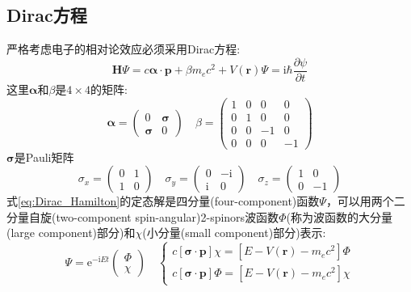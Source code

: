 \documentclass[10pt, oneside, a4paper]{article}      %
\begin{document}
\subsection{\rm{Dirac}方程}
严格考虑电子的相对论效应必须采用\textrm{Dirac}方程:
\begin{equation}
	\mathbf{H}\Psi=c\mathbf{\alpha}\cdot\mathbf{p}+\beta m_ec^2+V(\mathbf{r})\Psi=\mathrm{i}\hbar\dfrac{\partial\psi}{\partial t}
	\label{eq:Dirac_Hamilton}
\end{equation}
这里$\mathbf{\alpha}$和$\beta$是$4\times4$的矩阵:
\begin{equation}
	\mathbf{\alpha}=
	\begin{pmatrix}
		0 &{\bm\sigma}\\
		{\bm\sigma} &0
	\end{pmatrix}\quad
	\beta=
	\begin{pmatrix}
		1 &0 &0 &0\\
		0 &1 &0 &0\\
		0 &0 &-1 &0\\
		0 &0 &0 &-1
	\end{pmatrix}
	\label{eq:alpha_beta}
\end{equation}
$\mathbf{\sigma}$是\textrm{Pauli}矩阵
\begin{equation}
	\sigma_x=
	\begin{pmatrix}
		0 &1\\
		1 &0
	\end{pmatrix}
	\quad \sigma_y=
	\begin{pmatrix}
		0 &-\mathrm{i}\\
		\mathrm{i} &0
	\end{pmatrix}
	\quad \sigma_z=
	\begin{pmatrix}
		1 &0\\
		0 &-1
	\end{pmatrix}
	\label{eq:Pauli_maxtix}
\end{equation}
式\eqref{eq:Dirac_Hamilton}的定态解是四分量(\textrm{four-component})函数$\Psi$，可以用两个二分量自旋(\textrm{two-component spin-angular})2-\textrm{spinors}波函数$\Phi$(称为波函数的大分量(\textrm{large component})部分)和$\chi$(小分量(\textrm{small component})部分)表示:
\begin{equation}
	\Psi = \mathrm{e}^{-\mathrm{i}Et}
	\begin{pmatrix}
		\Phi\\\chi
	\end{pmatrix}
	\quad\left\{
		\begin{aligned}
			c[{\bm\sigma}\cdot\mathbf{p}]\chi = [E-V(\mathbf{r})-m_ec^2]\Phi\\
			c[{\bm\sigma}\cdot\mathbf{p}]\Phi = [E-V(\mathbf{r})-m_ec^2]\chi
		\end{aligned}
		\right.
	\label{eq:two-component}
\end{equation}
\end{document}
